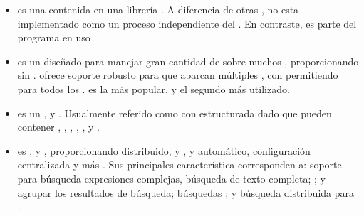 \begin{itemize}
		\item
			\textbf{\sqlite} es una \rdbms contenida en una librería \cprogramming. A diferencia de otras \dbmangesystem, \sqlite no esta implementado como un proceso independiente del \clientAS. En contraste, es parte del programa en uso \cite{online_video_introduction_sqlite}.
	
		\item
			\textbf{\cassandraNAME} es un \nosqlNAME \wideColumnDB \store \openSourcePC diseñado para manejar gran cantidad de \dataPC sobre muchos \commodityServerPC, proporcionando \highAvailabilityDB sin \singlePointFailurePC. \cassandraNAME ofrece soporte robusto para \clustersAS que abarcan múltiples \dataCentersPC \cite{online_cassandra_multi_def}, con \masterlessDB \asynRepDB permitiendo \lowLatencyOperationsINT para todos los \clientsAS. \cassandraNAME es la \wideColumnDB \store más popular, y el segundo \nosqlNAME más utilizado\cite{online_db_engines_ranking}.
	
		\item
			\textbf{\redisNAME} es un \nosqlNAME \openSourcePC, \keyValueDB \cachePC y \store. Usualmente referido como \serverAS con \dataPC estructurada dado que \keysDB pueden contener \stringsPL, \hashesPL, \listsPL, \setsPL, \sortedPL, \bitmapsPL y \hyperloglogsPL \cite{online_redis_website}.

		\item
			\textbf{\solrNAME} es \highly \reliableQA, \scalableQA y \faultTolerantQA, proporcionando \indexingDB distribuido, \replicationDB y \queryingDB \loadBalancedDB, \failoverPC y \recoveryDB automático, configuración centralizada y más \cite{online_official_website_solrn}. Sus principales característica corresponden a: soporte para búsqueda expresiones complejas, búsqueda de texto completa; \stemmingDB; \rankingCPT y agrupar los resultados de búsqueda; búsquedas \geoSpatialCPT; y búsqueda distribuida para \highScalabilityDB \cite{online_dbengines_solr_info}.
		
\end{itemize}

